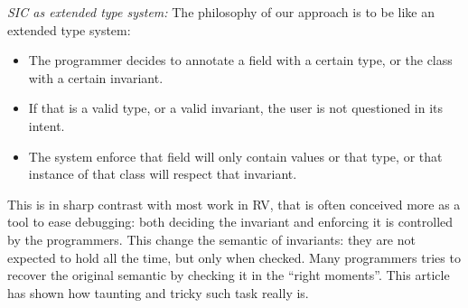 \noindent\textit{SIC as extended type system:}
The philosophy of our approach is to be like an extended type system: 
\begin{itemize}
\item The programmer decides to annotate a field with a certain type, or the class with a certain invariant.
\item If that is a valid type, or a valid invariant, the user is not questioned in its intent.
\item The system enforce that field will only contain values or that type, or that instance of that class
will respect that invariant.
\end{itemize}
This is in sharp contrast with most work in RV, that is often conceived more as a tool to ease debugging:
both deciding the invariant and enforcing it is controlled by the programmers.
This change the semantic of invariants: they are not expected to hold all the time,
but only when checked. Many programmers tries to recover the original semantic
by checking it in the ``right moments''. This article has shown how taunting and tricky such task really is.